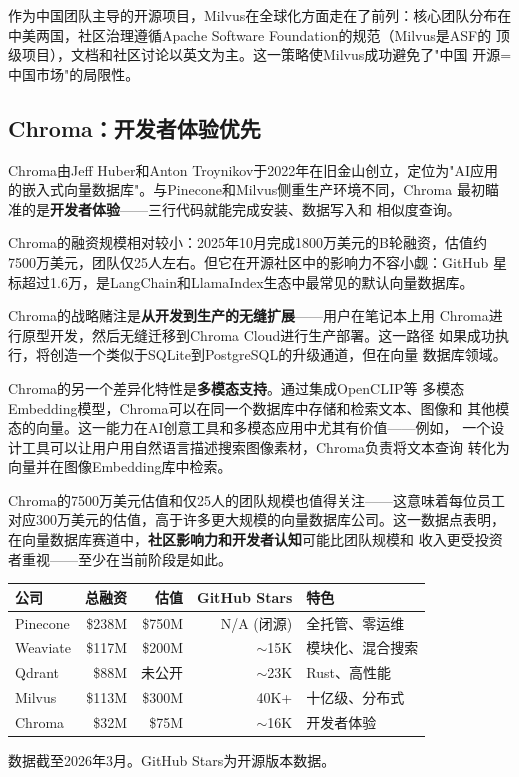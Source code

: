 作为中国团队主导的开源项目，Milvus在全球化方面走在了前列：核心团队分布在
中美两国，社区治理遵循Apache Software Foundation的规范（Milvus是ASF的
顶级项目），文档和社区讨论以英文为主。这一策略使Milvus成功避免了"中国
开源=中国市场"的局限性。

\subsection{Chroma：开发者体验优先}
\label{subsec:chroma}

Chroma由Jeff Huber和Anton Troynikov于2022年在旧金山创立，定位为"AI应用
的嵌入式向量数据库"。与Pinecone和Milvus侧重生产环境不同，Chroma
最初瞄准的是\textbf{开发者体验}——三行代码就能完成安装、数据写入和
相似度查询。

Chroma的融资规模相对较小：2025年10月完成1800万美元的B轮融资，估值约
7500万美元，团队仅25人左右。但它在开源社区中的影响力不容小觑：GitHub
星标超过1.6万，是LangChain和LlamaIndex生态中最常见的默认向量数据库。

Chroma的战略赌注是\textbf{从开发到生产的无缝扩展}——用户在笔记本上用
Chroma进行原型开发，然后无缝迁移到Chroma Cloud进行生产部署。这一路径
如果成功执行，将创造一个类似于SQLite到PostgreSQL的升级通道，但在向量
数据库领域。

Chroma的另一个差异化特性是\textbf{多模态支持}。通过集成OpenCLIP等
多模态Embedding模型，Chroma可以在同一个数据库中存储和检索文本、图像和
其他模态的向量。这一能力在AI创意工具和多模态应用中尤其有价值——例如，
一个设计工具可以让用户用自然语言描述搜索图像素材，Chroma负责将文本查询
转化为向量并在图像Embedding库中检索。

Chroma的7500万美元估值和仅25人的团队规模也值得关注——这意味着每位员工
对应300万美元的估值，高于许多更大规模的向量数据库公司。这一数据点表明，
在向量数据库赛道中，\textbf{社区影响力和开发者认知}可能比团队规模和
收入更受投资者重视——至少在当前阶段是如此。

\begin{keybox}[向量数据库赛道融资与估值对比]
\small
\begin{tabularx}{\textwidth}{l r r r l}
\toprule
\rowcolor{figLightGray}
\textbf{公司} & \textbf{总融资} & \textbf{估值} & \textbf{GitHub Stars} & \textbf{特色} \\
\midrule
Pinecone   & \$238M & \$750M  & N/A (闭源)  & 全托管、零运维 \\
Weaviate   & \$117M & \$200M  & $\sim$15K   & 模块化、混合搜索 \\
Qdrant     & \$88M  & 未公开  & $\sim$23K   & Rust、高性能 \\
Milvus     & \$113M & \$300M  & 40K+        & 十亿级、分布式 \\
Chroma     & \$32M  & \$75M   & $\sim$16K   & 开发者体验 \\
\bottomrule
\end{tabularx}

\medskip
\noindent 数据截至2026年3月。GitHub Stars为开源版本数据。
\end{keybox}

